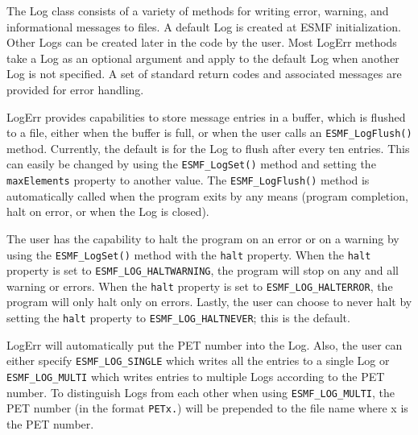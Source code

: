 


\label{sec:LogErr}

The Log class consists of a variety of methods for writing error, warning, and
informational messages to files.  A default Log is created at ESMF
initialization.  Other Logs can be created later in the code by the user.  Most
LogErr methods take a Log as an optional argument and apply to the default Log
when another Log is not specified.  A set of standard return codes and
associated messages are provided for error handling.  

LogErr provides capabilities to store message entries in a buffer, which is 
flushed to a file, either when the buffer is full, or when the user calls an 
{\tt ESMF\_LogFlush()} method.  Currently, the default is for the Log to flush
after every ten entries.  This can easily be changed by using the 
{\tt ESMF\_LogSet()} method and setting the {\tt maxElements} property to 
another value.  The {\tt ESMF\_LogFlush()} method is automatically called when 
the program exits by any means (program completion, halt on error, or when the
Log is closed).

The user has the capability to halt the program on an error or on a warning by
using the {\tt ESMF\_LogSet()} method with the {\tt halt} property.  When the 
{\tt halt} property is set to {\tt ESMF\_LOG\_HALTWARNING}, the program will 
stop on any and all warning or errors.  When the {\tt halt} property is set to 
{\tt ESMF\_LOG\_HALTERROR}, the program will only halt only on errors.  Lastly,
the user can choose to never halt by setting the {\tt halt} property to 
{\tt ESMF\_LOG\_HALTNEVER}; this is the default.

LogErr will automatically put the PET number into the Log.  Also, the user can 
either specify {\tt ESMF\_LOG\_SINGLE} which writes all the entries to a single 
Log or {\tt ESMF\_LOG\_MULTI} which writes entries to multiple Logs according to 
the PET number.  To distinguish Logs from each other when using 
{\tt ESMF\_LOG\_MULTI}, the PET number (in the format {\tt PETx.}) will be 
prepended to the file name where x is the PET number.

